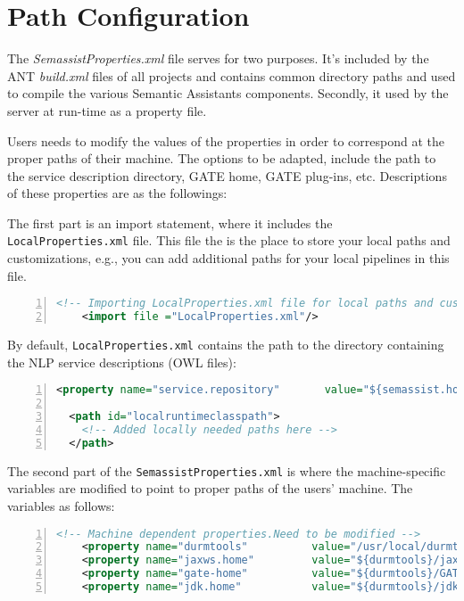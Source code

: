 \section{Path Configuration}
\label{sec:props}
The \emph{SemassistProperties.xml} file serves for two purposes.  It's
included by the ANT \emph{build.xml} files of all projects and
contains common directory paths and used to compile the various
Semantic Assistants components. Secondly, it used by the server at
run-time as a property file.

Users needs to modify the values of the properties in order to
correspond at the proper paths of their machine. The options to be
adapted, include the path to the service description directory, GATE
home, GATE plug-ins, etc. Descriptions of these properties are as the
followings:

The first part is an import statement, where it includes the
\texttt{LocalProperties.xml} file. This file the is the place to store
your local paths and customizations, e.g., you can add additional paths
for your local pipelines in this file.
\begin{lstlisting}[language=XML,numbers=left,xleftmargin=8mm,columns=flexible]
    <!-- Importing LocalProperties.xml file for local paths and customizations -->
    <import file ="LocalProperties.xml"/>
\end{lstlisting}
By default, \texttt{LocalProperties.xml} contains the path to the directory containing the NLP
service descriptions (OWL files):
\begin{lstlisting}[language=XML,numbers=left,xleftmargin=8mm,columns=flexible]
  <property name="service.repository"       value="${semassist.home}/Resources/OwlServiceDescriptions/"/>

  <path id="localruntimeclasspath">
    <!-- Added locally needed paths here -->
  </path>
\end{lstlisting}


The second part of the \texttt{SemassistProperties.xml} is where the
machine-specific variables are modified to point to proper paths of
the users' machine. The variables as follows:
\begin{lstlisting}[language=XML,numbers=left,xleftmargin=8mm,columns=flexible]
    <!-- Machine dependent properties.Need to be modified -->
    <property name="durmtools"          value="/usr/local/durmtools" />
    <property name="jaxws.home"         value="${durmtools}/jaxws-ri" />
    <property name="gate-home"          value="${durmtools}/GATE/gate" />
    <property name="jdk.home"           value="${durmtools}/jdk" />
\end{lstlisting}

